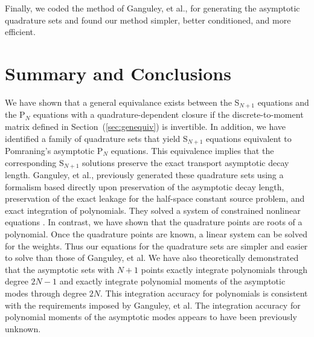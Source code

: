 \documentclass[12pt]{article}
\newcommand{\bc}{\begin{center}}
\newcommand{\ec}{\end{center}}
\begin{document}
Finally, we coded the method of 
Ganguley, et al., for generating the asymptotic quadrature sets and found our method simpler, better conditioned, 
and more efficient.



\section{Summary and Conclusions}


We have shown that a general equivalance exists between the S$_{N+1}$ equations and the 
P$_N$ equations with a quadrature-dependent closure if the discrete-to-moment matrix defined in Section~(\ref{sec:genequiv}) is invertible.  In addition, we have identified a family of quadrature sets that yield S$_{N+1}$ equations 
equivalent to Pomraning's asymptotic P$_N$ equations.  This equivalence implies that the corresponding S$_{N+1}$ solutions preserve the exact transport asymptotic decay length.
Ganguley, et al., previously generated these quadrature sets using a formalism based directly 
upon preservation of the asymptotic decay length, preservation of the exact leakage for the half-space 
constant source problem, and exact integration of polynomials. They solved a system 
of constrained nonlinear equations \cite{ganguley}. In contrast, we have shown that the quadrature points 
are roots of a polynomial. Once the quadrature points are known, a linear system can be solved for the 
weights.  Thus our equations for the quadrature sets are simpler and easier to solve than those of 
Ganguley, et al. We have also theoretically demonstrated that the asymptotic sets with $N+1$ points exactly integrate 
polynomials through degree $2N-1$ and exactly integrate polynomial moments of the asymptotic modes through 
degree $2N$.  This integration accuracy for polynomials is consistent with the requirements imposed by 
Ganguley, et al.  The integration accuracy for polynomial moments of the asymptotic modes appears to have 
been previously unknown.
\end{document}
